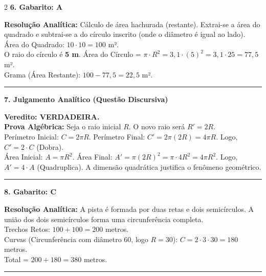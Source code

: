 \documentclass[11pt, a4paper]{article}
\begin{document}
\begin{multicols*}{2}
\textbf{6. Gabarito: \textcolor{CorGabarito}{A}}
\begin{boxresponda}
\textbf{Resolução Analítica:} Cálculo de área hachurada (restante). Extrai-se a área do quadrado e subtrai-se a do círculo inscrito (onde o diâmetro é igual ao lado).
\\[0.1cm]
Área do Quadrado: $10 \cdot 10 = 100$ m².
\\[0.1cm]
O raio do círculo é \textbf{5 m}. Área do Círculo = $\pi \cdot R^2 = 3,1 \cdot (5)^2 = 3,1 \cdot 25 = 77,5$ m².
\\[0.1cm]
Grama (Área Restante): $100 - 77,5 = 22,5$ m².
\end{boxresponda}

\vspace{0.4cm}
\noindent\textcolor{CorLinha}{\rule{\linewidth}{0.5pt}} 
\vspace{0.2cm}

\textbf{7. Julgamento Analítico (Questão Discursiva)}
\begin{boxresponda}
\textbf{Veredito: VERDADEIRA.}
\\[0.1cm]
\textbf{Prova Algébrica:}
Seja o raio inicial $R$. O novo raio será $R' = 2R$.
\\[0.1cm]
Perímetro Inicial: $C = 2\pi R$.
Perímetro Final: $C' = 2\pi (2R) = 4\pi R$. Logo, $C' = 2 \cdot C$ (Dobra).
\\[0.1cm]
Área Inicial: $A = \pi R^2$.
Área Final: $A' = \pi (2R)^2 = \pi \cdot 4R^2 = 4\pi R^2$. Logo, $A' = 4 \cdot A$ (Quadruplica). A dimensão quadrática justifica o fenômeno geométrico.
\end{boxresponda}

\vspace{0.4cm}
\noindent\textcolor{CorLinha}{\rule{\linewidth}{0.5pt}} 
\vspace{0.2cm}

\textbf{8. Gabarito: \textcolor{CorGabarito}{C}}
\begin{boxresponda}
\textbf{Resolução Analítica:} A pista é formada por duas retas e dois semicírculos. A união dos dois semicírculos forma uma circunferência completa.
\\[0.1cm]
Trechos Retos: $100 + 100 = 200$ metros.
\\[0.1cm]
Curvas (Circunferência com diâmetro 60, logo $R = 30$):
$C = 2 \cdot 3 \cdot 30 = 180$ metros.
\\[0.1cm]
Total = $200 + 180 = 380$ metros.
\end{boxresponda}

\vspace{0.4cm}
\noindent\textcolor{CorLinha}{\rule{\linewidth}{0.5pt}} 
\vspace{0.2cm}


\end{multicols*}
\end{document}
